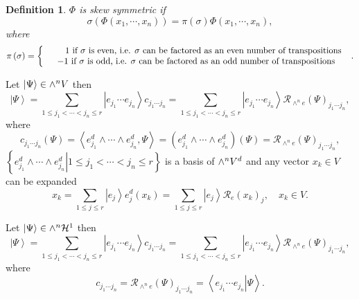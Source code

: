 \documentclass[aps,preprint]{revtex4}%
\newtheorem{definition}[theorem]{Definition}
\begin{document}
\begin{definition}
$\Phi$ is skew symmetric if
\begin{equation}
\sigma\left(  \Phi\left(  x_{1},\cdots,x_{n}\right)  \right)  =\pi\left(
\sigma\right)  \Phi\left(  x_{1},\cdots,x_{n}\right)  ,
\end{equation}
where
\begin{equation}
\pi\left(  \sigma\right)  =\left\{
\begin{array}
[c]{c}%
\quad\quad1\text{ if }\sigma\text{ is even, i.e. }\sigma\text{ can be factored
as an even number of transpositions }\\
-1\text{ if }\sigma\text{ is odd, i.e. }\sigma\text{ can be factored as an odd
number of transpositions}%
\end{array}
\right.  .
\end{equation}

\end{definition}

Let $\left\vert \Psi\right\rangle \in{\LARGE \wedge}^{n}V$ then
\begin{equation}
\left\vert \Psi\right\rangle =\sum_{1\leq j_{1}<\cdots<j_{n}\leq r}\left\vert
e_{j_{1}}\cdots e_{j_{n}}\right\rangle c_{j_{1}\cdots j_{n}}=\sum_{1\leq
j_{1}<\cdots<j_{n}\leq r}\left\vert e_{j_{1}}\cdots e_{j_{n}}\right\rangle
\mathcal{R}_{\wedge^{n}e}\left(  \Psi\right)  _{j_{1}\cdots j_{n}},
\end{equation}
where%
\begin{equation}
c_{j_{1}\cdots j_{n}}\left(  \Psi\right)  =\left\langle e_{j_{1}}^{d}%
\wedge\cdots\wedge e_{j_{n}}^{d},\Psi\right\rangle =\left(  e_{j_{1}}%
^{d}\wedge\cdots\wedge e_{j_{n}}^{d}\right)  \left(  \Psi\right)
=\mathcal{R}_{\wedge^{n}e}\left(  \Psi\right)  _{j_{1}\cdots j_{n}},
\end{equation}
$\left\{  \left.  e_{j_{1}}^{d}\wedge\cdots\wedge e_{j_{n}}^{d}\right\vert
1\leq j_{1}<\cdots<j_{n}\leq r\right\}  $ is a basis of ${\LARGE \wedge}%
^{n}V^{d}$ and any vector $x_{k}\in V$ can be expanded
\begin{equation}
x_{k}=\sum_{1\leq j\leq r}\left\vert e_{j}\right\rangle e_{j}^{d}\left(
x_{k}\right)  =\sum_{1\leq j\leq r}\left\vert e_{j}\right\rangle
\mathcal{R}_{e}\left(  x_{k}\right)  _{j},\quad x_{k}\in V.
\end{equation}


Let $\left\vert \Psi\right\rangle \in{\LARGE \wedge}^{n}\mathcal{H}^{1}$ then
\begin{equation}
\left\vert \Psi\right\rangle =\sum_{1\leq j_{1}<\cdots<j_{n}\leq r}\left\vert
e_{j_{1}}\cdots e_{j_{n}}\right\rangle c_{j_{1}\cdots j_{n}}=\sum_{1\leq
j_{1}<\cdots<j_{n}\leq r}\left\vert e_{j_{1}}\cdots e_{j_{n}}\right\rangle
\mathcal{R}_{\wedge^{n}e}\left(  \Psi\right)  _{j_{1}\cdots j_{n}},
\end{equation}
where%
\begin{equation}
c_{j_{1}\cdots j_{n}}=\mathcal{R}_{\wedge^{n}e}\left(  \Psi\right)
_{j_{1}\cdots j_{n}}=\left\langle \left.  e_{j_{1}}\cdots e_{j_{n}}\right\vert
\Psi\right\rangle .
\end{equation}
\end{document}
